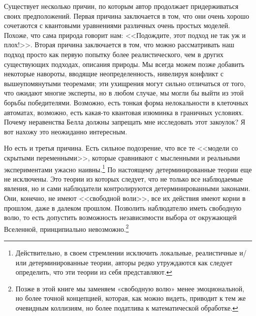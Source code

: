 \documentclass[main.tex]{subfiles}
\begin{document}
Существует несколько причин, по которым автор продолжает придерживаться своих предположений. Первая причина заключается в том, что они очень хорошо сочетаются с квантовыми уравнениями различных очень простых моделей. Похоже, что сама природа говорит нам: <<Подождите, этот подход не так уж и плох!>>. Вторая причина заключается в том, что можно рассматривать наш подход просто как первую попытку более реалистического, чем в других существующих подходах, описания природы. Мы всегда можем позже добавить некоторые навороты, вводящие неопределенность, нивелируя конфликт с вышеупомянутыми теоремами; эти ухищрения могут сильно отличаться от того, что ожидают многие эксперты, но в любом случае, мы могли бы выйти из этой борьбы победителями. Возможно, есть тонкая форма нелокальности в клеточных автоматах, возможно, есть какая-то квантовая изюминка в граничных условиях. Почему неравенства Белла должны запрещать мне исследовать этот закоулок? Я вот нахожу это неожиданно интересным. 

Но есть и третья причина. Есть сильное подозрение, что все те <<модели со скрытыми переменными>>, которые сравнивают с мысленными и реальными экспериментами ужасно наивны.\footnote{Действительно, в своем стремлении исключить локальные, реалистичные и/или детерминированные теории, авторы редко утруждаются как следует определить, что эти теории из себя представляют.} По настоящему детерминированные теории еще не исключены. Это теории из которых следует, что не только все наблюдаемые явления, но и сами наблюдатели контролируются детерминированными законами. Они, конечно, не имеют <<свободной воли>>, все их действия имеют корни в прошлом, даже в далеком прошлом. Позволить наблюдателю иметь свободную волю, то есть допустить возможность независимости выбора от окружающей Вселенной, принципиально невозможно.\footnote{Позже в этой книге мы заменяем «свободную волю» менее эмоциональной, но более точной концепцией, которая, как можно видеть, приводит к тем же очевидным коллизиям, но более податлива к математической обработке.} 
\end{document}
